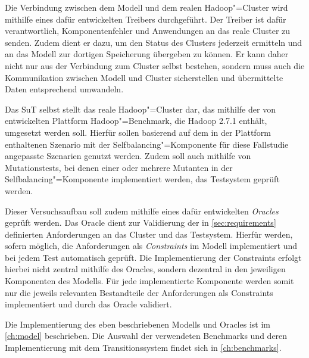 Die Verbindung zwischen dem Modell und dem realen Hadoop"=Cluster wird mithilfe eines dafür entwickelten Treibers durchgeführt.
Der Treiber ist dafür verantwortlich, Komponentenfehler und Anwendungen an das reale Cluster zu senden.
Zudem dient er dazu, um den Status des Clusters jederzeit ermitteln und an das Modell zur dortigen Speicherung übergeben zu können.
Er kann daher nicht nur aus der Verbindung zum Cluster selbst bestehen, sondern muss auch die Kommunikation zwischen Modell und Cluster sicherstellen und übermittelte Daten entsprechend umwandeln.

Das \ac{SuT} selbst stellt das reale Hadoop"=Cluster dar, das mithilfe der von \citeauthor{Zhang2016} entwickelten Plattform Hadoop"=Benchmark, die Hadoop 2.7.1 enthält, umgesetzt werden soll.
Hierfür sollen basierend auf dem in der Plattform enthaltenen Szenario mit der Selfbalancing"=Komponente für diese Fallstudie angepasste Szenarien genutzt werden.
Zudem soll auch mithilfe von Mutationstests, bei denen einer oder mehrere Mutanten in der Selfbalancing"=Komponente implementiert werden, das Testsystem geprüft werden.

Dieser Versuchsaufbau soll zudem mithilfe eines dafür entwickelten \emph{Oracles} geprüft werden.
Das Oracle dient zur Validierung der in \cref{sec:requirements} definierten Anforderungen an das Cluster und das Testsystem.
Hierfür werden, sofern möglich, die Anforderungen als \emph{Constraints} im Modell implementiert und bei jedem Test automatisch geprüft.
Die Implementierung der Constraints erfolgt hierbei nicht zentral mithilfe des Oracles, sondern dezentral in den jeweiligen Komponenten des Modells.
Für jede implementierte Komponente werden somit nur die jeweils relevanten Bestandteile der Anforderungen als Constraints implementiert und durch das Oracle validiert.

Die Implementierung des eben beschriebenen Modells und Oracles ist im \cref{ch:model} beschrieben.
Die Auswahl der verwendeten Benchmarks und deren Implementierung mit dem Transitionssystem findet sich in \cref{ch:benchmarks}.
